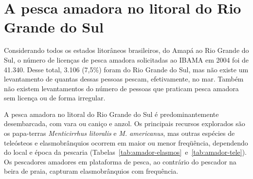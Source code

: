 \documentclass[a4paper,11pt,twoside,showtrims,onecolumn,openright,final]{memoir}
\begin{document}
\section*{A pesca amadora no litoral do Rio Grande do Sul}

Considerando todos os estados litorâneos brasileiros, do Amapá ao Rio Grande do Sul, 
o número de licenças de pesca amadora solicitadas ao IBAMA em 2004 foi de 41.340.
Desse total, 3.106 (7,5\%) foram do Rio Grande do Sul, mas não existe um levantamento de 
quantas dessas pessoas pescam, efetivamente, no mar. Também não existem levantamentos do número 
de pessoas que praticam pesca amadora sem licença ou de forma irregular.

A pesca amadora no litoral do Rio Grande do Sul é predominantemente desembarcada, 
com vara ou caniço e anzol. Os principais recursos explorados são os 
papa-terras \emph{Menticirrhus litoralis} e \emph{M. americanus}, mas outras espécies 
de teleósteos e elasmobrânquios ocorrem em maior ou menor freqüência, 
dependendo do local e época da pescaria (Tabelas~\ref{tab:amador-elasmos}~e~\ref{tab:amador-tele}).
Os pescadores amadores em plataforma de pesca, ao contrário do pescador na beira de praia, 
capturam elasmobrânquios com frequência.



\end{document}

